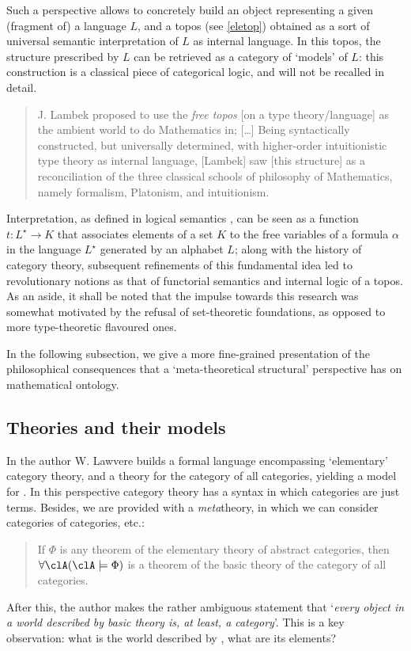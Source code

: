 Such a perspective allows to concretely build an object representing a given (fragment of) a language $L$, and a topos (see \autoref{eletop}) obtained as a sort of universal semantic interpretation of $L$ as internal language. In this topos, the structure prescribed by $L$ can be retrieved as a category of `models' of $L$: this construction is a classical piece of categorical logic, and will not be recalled in detail.%
\begin{quote}
    J. Lambek proposed to use the \emph{free topos} [on a type theory/language] as the ambient world to do Mathematics in; [\dots\unkern] Being syntactically constructed, but universally determined, with higher-order intuitionistic type theory as internal language, [Lambek] saw [this structure] as a reconciliation of the three classical schools of philosophy of Mathematics, namely formalism, Platonism, and intuitionism. \hfill\cite{free_topos}
\end{quote}
Interpretation, as defined in logical semantics \cite{gamut1991logic}, can be seen as a function $t: L^\star \to K$ that associates elements of a set $K$ to the free variables of a formula $\alpha$ in the language $L^\star$ generated by an alphabet $L$; along with the history of category theory, subsequent refinements of this fundamental idea led to revolutionary notions as that of functorial semantics and internal logic of a topos.
As an aside, it shall be noted that the impulse towards this research was somewhat motivated by the refusal of set-theoretic foundations, as opposed to more type-theoretic flavoured ones.

In the following subsection, we give a more fine-grained presentation of the philosophical consequences that a `meta\hyp{}theoretical structural' perspective has on mathematical ontology.
\subsection{Theories and their models}
In \cite{lajolla} the author W. Lawvere builds a formal language  encompassing `elementary' category theory, and a theory  for the category of all categories, yielding a model for . In this perspective category theory has a syntax in which categories are just terms. Besides, we are provided with a \emph{meta}theory, in which we can consider categories of categories, etc.:
\begin{quote}
    If $\Phi$ is any theorem of the elementary theory of abstract categories, then $\forall \clA (\clA \models \Phi)$ is a theorem of the basic theory of the category of all categories. \hfill \cite{lajolla}
\end{quote}
After this, the author makes the rather ambiguous statement that `\textit{every object in a world described by basic theory is, at least, a category}'. This is a key observation: what is the world described by , what are its elements?

